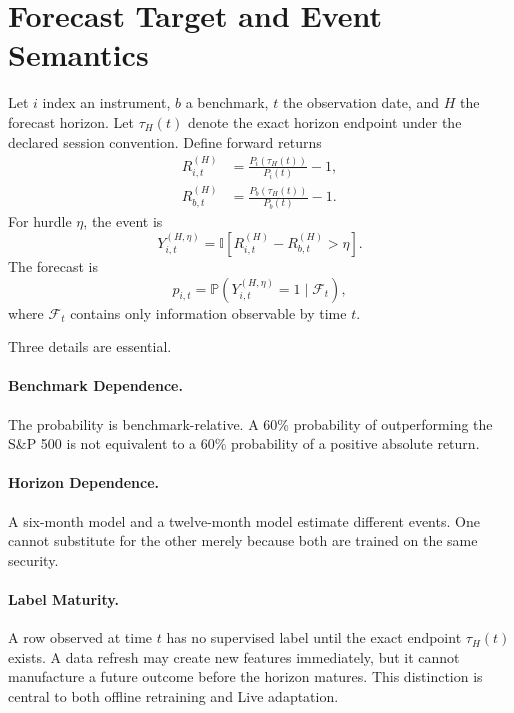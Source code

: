 \documentclass[11pt]{article}
\newcommand{\Prb}{\mathbb{P}}
\newcommand{\I}{\mathbb{I}}
\begin{document}
\section{Forecast Target and Event Semantics}
Let $i$ index an instrument, $b$ a benchmark, $t$ the observation date, and $H$ the forecast horizon. Let $\tau_H(t)$ denote the exact horizon endpoint under the declared session convention. Define forward returns
\begin{align}
R_{i,t}^{(H)} &= \frac{P_i(\tau_H(t))}{P_i(t)}-1,\\
R_{b,t}^{(H)} &= \frac{P_b(\tau_H(t))}{P_b(t)}-1.
\end{align}
For hurdle $\eta$, the event is
\begin{equation}
Y_{i,t}^{(H,\eta)}=\I\left[R_{i,t}^{(H)}-R_{b,t}^{(H)}>\eta\right].
\end{equation}
The forecast is
\begin{equation}
p_{i,t}=\Prb\left(Y_{i,t}^{(H,\eta)}=1\mid\mathcal{F}_t\right),
\end{equation}
where $\mathcal{F}_t$ contains only information observable by time $t$.

Three details are essential.

\paragraph{Benchmark Dependence.} The probability is benchmark-relative. A 60\% probability of outperforming the S\&P 500 is not equivalent to a 60\% probability of a positive absolute return.

\paragraph{Horizon Dependence.} A six-month model and a twelve-month model estimate different events. One cannot substitute for the other merely because both are trained on the same security.

\paragraph{Label Maturity.} A row observed at time $t$ has no supervised label until the exact endpoint $\tau_H(t)$ exists. A data refresh may create new features immediately, but it cannot manufacture a future outcome before the horizon matures. This distinction is central to both offline retraining and Live adaptation.
\end{document}
